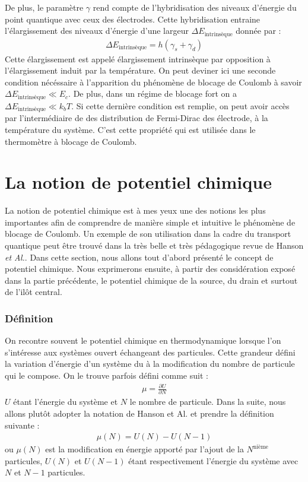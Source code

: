 De plus, le paramètre $\gamma$ rend compte de l'hybridisation des niveaux d'énergie du point quantique avec ceux des électrodes. Cette hybridisation entraine l'élargissement des niveaux d'énergie d'une largeur $\Delta E_{\text{intrinsèque}}$ donnée par :
\begin{eqnarray}
\Delta E_{\text{intrinsèque}} = h (\gamma_s + \gamma_d)
\end{eqnarray}
Cette élargissement est appelé élargissement intrinsèque par opposition à l'élargissement induit par la température. On peut deviner ici une seconde condition nécéssaire à l'apparition du phénomène de blocage de Coulomb à savoir $\Delta E_{\text{intrinsèque}} \ll E_c$. De plus, dans un régime de blocage fort on a $\Delta E_{\text{intrinsèque}} \ll k_bT$. Si cette dernière condition est remplie, on peut avoir accès par l'intermédiaire de des distribution de Fermi-Dirac des électrode, à la température du système. C'est cette propriété qui est utilisée dans le thermomètre à blocage de Coulomb.





\section{La notion de potentiel chimique}
La notion de potentiel chimique est à mes yeux une des notions les plus importantes afin de comprendre de manière simple et intuitive le phénomène de blocage de Coulomb. Un exemple de son utilisation dans la cadre du transport quantique peut \^etre trouvé dans la très belle et très pédagogique revue de Hanson \textit{et Al.}. Dans cette section, nous allons tout d'abord présenté le concept de potentiel chimique. Nous exprimerons ensuite, à partir des considération exposé dans la partie précédente, le potentiel chimique de la source, du drain et surtout de l'ilôt central.

\subsubsection{Définition}

On recontre souvent le potentiel chimique en thermodynamique lorsque l'on s'intéresse aux systèmes ouvert échangeant des particules. Cette grandeur défini la variation d'énergie d'un système du à la modification du nombre de particule qui le compose. On le trouve parfois défini comme suit :
\begin{eqnarray}
\mu = \frac{\partial U}{\partial N} \nonumber
\end{eqnarray}
$U$ étant l'énergie du système et $N$ le nombre de particule. Dans la suite, nous allons plut\^ot adopter la notation de Hanson et Al. et prendre la définition suivante :
\begin{eqnarray}
\mu(N) = U(N) - U(N-1)
\end{eqnarray}
ou $\mu(N)$ est la modification en énergie apporté par l'ajout de la $N^\text{nième}$ particules, $U(N)$ et $U(N-1)$ étant respectivement l'énergie du système avec $N$ et $N-1$ particules.

